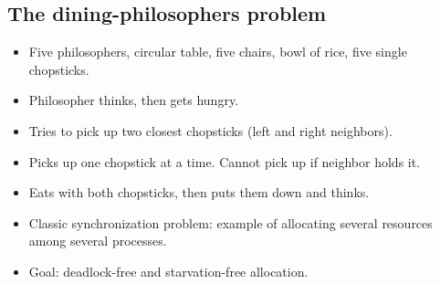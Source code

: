 \subsection{The dining-philosophers problem}
\begin{itemize}
    \item Five philosophers, circular table, five chairs, bowl of rice, five single chopsticks.
    \item Philosopher thinks, then gets hungry.
    \item Tries to pick up two closest chopsticks (left and right neighbors).
    \item Picks up one chopstick at a time. Cannot pick up if neighbor holds it.
    \item Eats with both chopsticks, then puts them down and thinks.
    \item Classic synchronization problem: example of allocating several resources among several processes.
    \item Goal: deadlock-free and starvation-free allocation.


\end{itemize}
